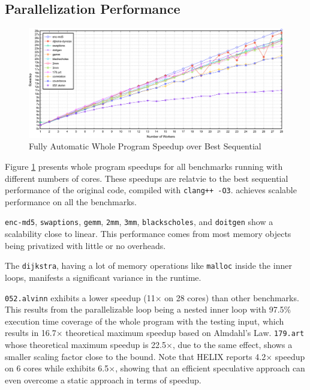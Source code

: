 \subsection{Parallelization Performance}

\begin{figure}[ht]
  \includegraphics[width=\textwidth]{figures/multi-core-crop}
  \caption{Fully Automatic Whole Program Speedup over Best Sequential}
  \label{fig:multi-core-scale}
\end{figure}

Figure \ref{fig:multi-core-scale} presents whole program speedups for
all benchmarks running with different numbers of cores. These speedups are
relatvie to the best sequential performance of the original code, compiled
with \texttt{clang++ -O3}. \name achieves scalable performance on all the
benchmarks.

\texttt{enc-md5}, \texttt{swaptions}, \texttt{gemm}, \texttt{2mm},
\texttt{3mm}, \texttt{blackscholes}, and \texttt{doitgen} show a
scalability close to linear. This performance comes from most memory
objects being privatized with little or no overheads.

The \texttt{dijkstra}, having a lot of memory operations like
\texttt{malloc} inside the inner loops, manifests a significant variance in
the runtime.

\texttt{052.alvinn} exhibits a lower speedup (11$\times$ on 28
cores) than other benchmarks. This results from the parallelizable loop
being a nested inner loop with 97.5\% execution time coverage of the whole
program with the testing input, which results in 16.7$\times$
theoretical maximum speedup based on Almdahl's Law.
\texttt{179.art} whose theoretical maximum speedup is 22.5$\times$, due to
the same effect, shows a smaller scaling factor close to the bound. Note
that HELIX\cite{simone:12:cgo} reports 4.2$\times$ speedup on 6 cores while
\name exhibits 6.5$\times$, showing that an efficient speculative approach
can even overcome a static approach in terms of speedup.

